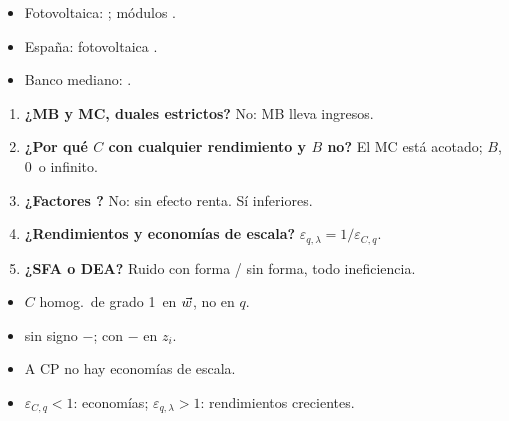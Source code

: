 \documentclass{article}
\begin{document}
\begin{columnas}
\anexorepaso
{}
\begin{itemize}
\item Fotovoltaica: ; módulos .
\item España: fotovoltaica .
\item Banco mediano: .
\end{itemize}
\begin{enumerate}
\item \textbf{¿MB y MC, duales estrictos?} No: MB lleva ingresos.
\item \textbf{¿Por qué $C$ con cualquier rendimiento y $B$ no?} El MC está acotado; $B$, 0~o infinito.
\item \textbf{¿Factores ?} No: sin efecto renta. Sí inferiores.
\item \textbf{¿Rendimientos y economías de escala?} $\varepsilon_{q,\lambda}=1/\varepsilon_{C,q}$.
\item \textbf{¿SFA o DEA?} Ruido con forma / sin forma, todo ineficiencia.
\end{enumerate}
\begin{trampa}
\begin{itemize}
\item $C$ homog.\ de grado 1~en $\vec{w}$, no en $q$.
\item {} sin signo $-$;  con $-$ en $z_i$.
\item A CP no hay economías de escala.
\item $\varepsilon_{C,q}<1$: economías; $\varepsilon_{q,\lambda}>1$: rendimientos crecientes.
\end{itemize}
\end{trampa}

\end{columnas}
\end{document}
